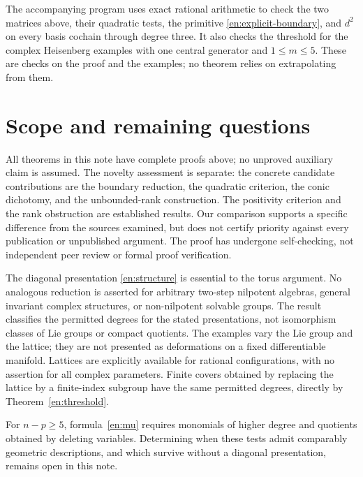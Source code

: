 \documentclass[12pt]{amsart}
\theoremstyle{definition}
\theoremstyle{remark}
\numberwithin{equation}{section}
\begin{document}
The accompanying program uses exact rational arithmetic to check the two
matrices above, their quadratic tests, the primitive
\eqref{en:explicit-boundary}, and $d^2$ on every basis cochain through degree
three. It also checks the threshold for the complex Heisenberg examples
with one central generator and $1\leq m\leq5$. These are checks on the
proof and the examples; no theorem relies on extrapolating from them.

\section{Scope and remaining questions}
All theorems in this note have complete proofs above; no unproved auxiliary
claim is assumed. The novelty assessment is separate: the concrete candidate
contributions are the boundary reduction, the quadratic criterion, the conic
dichotomy, and the unbounded-rank construction. The positivity criterion and
the rank obstruction are established results. Our comparison supports a
specific difference from the sources examined, but does not certify priority
against every publication or unpublished argument. The proof has undergone
self-checking, not independent peer review or formal proof verification.

The diagonal presentation \eqref{en:structure} is essential to the torus
argument. No analogous reduction is asserted for arbitrary two-step
nilpotent algebras, general invariant complex structures, or non-nilpotent
solvable groups. The result classifies the permitted degrees for the stated
presentations, not isomorphism classes of Lie groups or compact quotients.
The examples vary the Lie group and the lattice; they are not presented as
deformations on a fixed differentiable manifold. Lattices are explicitly
available for rational configurations, with no assertion for all complex
parameters. Finite covers obtained by replacing the lattice by a finite-index
subgroup have the same permitted degrees, directly by
Theorem~\ref{en:threshold}.

For $n-p\geq5$, formula~\eqref{en:mu} requires monomials of higher degree
and quotients obtained by deleting variables. Determining when these tests
admit comparably geometric descriptions, and which survive without a
diagonal presentation, remains open in this note.
\end{document}
